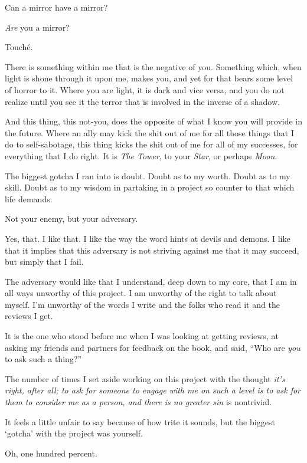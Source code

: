 \begin{paracol}{2}
\begin{rightcolumn}
  \begin{ally}
    Can a mirror have a mirror?
  \end{ally}
  \emph{Are} you a mirror?

  \begin{ally}
    Touché.
  \end{ally}
  There is something within me that is the negative of you. Something which, when light is shone through it upon me, makes you, and yet for that bears some level of horror to it. Where you are light, it is dark and vice versa, and you do not realize until you see it the terror that is involved in the inverse of a shadow.

  And this thing, this not-you, does the opposite of what I know you will provide in the future. Where an ally may kick the shit out of me for all those things that I do to self-sabotage, this thing kicks the shit out of me for all of my successes, for everything that I do right. It is \emph{The Tower}, to your \emph{Star}, or perhaps \emph{Moon}.

  The biggest gotcha I ran into is doubt. Doubt as to my worth. Doubt as to my skill. Doubt as to my wisdom in partaking in a project so counter to that which life demands.

  \begin{ally}
    Not your enemy, but your adversary.
  \end{ally}
  Yes, that. I like that. I like the way the word hints at devils and demons. I like that it implies that this adversary is not striving against me that it may succeed, but simply that I fail.

  The adversary would like that I understand, deep down to my core, that I am in all ways unworthy of this project. I am unworthy of the right to talk about myself. I'm unworthy of the words I write and the folks who read it and the reviews I get.

  It is the one who stood before me when I was looking at getting reviews, at asking my friends and partners for feedback on the book, and said, ``Who are \emph{you} to ask such a thing?''

  The number of times I set aside working on this project with the thought \emph{it's right, after all; to ask for someone to engage with me on such a level is to ask for them to consider me as a person, and there is no greater sin} is nontrivial.

  \begin{ally}
    It feels a little unfair to say because of how trite it sounds, but the biggest `gotcha' with the project was yourself.
  \end{ally}
  Oh, one hundred percent.


\end{rightcolumn}
\end{paracol}
